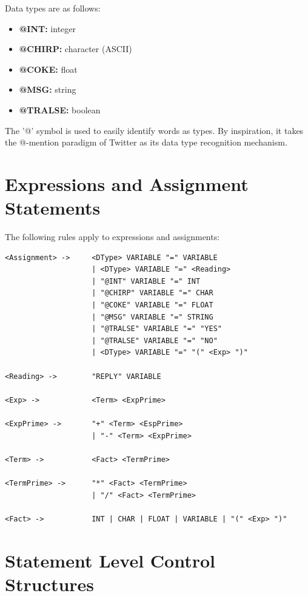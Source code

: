 \documentclass[11pt,a4paper]{report}
\begin{document}
Data types are as follows:
\begin{itemize}
  \item \textbf{@INT:} integer
  \item \textbf{@CHIRP:} character (ASCII)
  \item \textbf{@COKE:} float
  \item \textbf{@MSG:} string
  \item \textbf{@TRALSE:} boolean
\end{itemize}

The '@' symbol is used to easily identify words as types. By inspiration, it
takes the @-mention paradigm of Twitter as its data type recognition
mechanism.

\section{Expressions and Assignment Statements}

The following rules apply to expressions and assignments:
\begin{lstlisting}
<Assignment> -> 	<DType> VARIABLE "=" VARIABLE
                	| <DType> VARIABLE "=" <Reading>
                	| "@INT" VARIABLE "=" INT
                	| "@CHIRP" VARIABLE "=" CHAR
                	| "@COKE" VARIABLE "=" FLOAT
                	| "@MSG" VARIABLE "=" STRING
                	| "@TRALSE" VARIABLE "=" "YES"
                	| "@TRALSE" VARIABLE "=" "NO"
                	| <DType> VARIABLE "=" "(" <Exp> ")"

<Reading> -> 		"REPLY" VARIABLE

<Exp> -> 			<Term> <ExpPrime>

<ExpPrime> ->		"+" <Term> <EspPrime>
            		| "-" <Term> <ExpPrime>
            
<Term> -> 			<Fact> <TermPrime>

<TermPrime> ->		"*" <Fact> <TermPrime>
            		| "/" <Fact> <TermPrime>
            
<Fact> -> 			INT | CHAR | FLOAT | VARIABLE | "(" <Exp> ")"

\end{lstlisting}

\section{Statement Level Control Structures}
\end{document}

